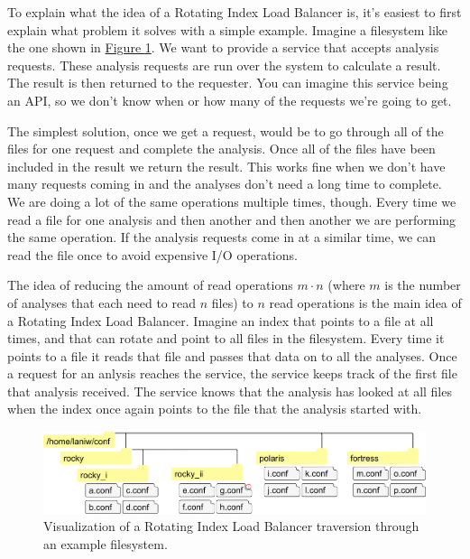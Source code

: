 \documentclass[11pt]{article} %
\newcommand{\rilb}{Rotating Index Load Balancer}
\newcommand{\hidelinks}[1]{{\hypersetup{hidelinks}#1}}
\newcommand{\figref}[1]{\hidelinks{\hyperref[#1]{Figure \ref{#1}}}}
\begin{document}
  To explain what the idea of a \rilb{} is, it's easiest to first explain what problem it solves with a simple example. Imagine a filesystem like the one shown in \figref{fig:rilb-vis}. We want to provide a service that accepts analysis requests. These analysis requests are run over the system to calculate a result. The result is then returned to the requester. You can imagine this service being an API, so we don't know when or how many of the requests we're going to get.

  The simplest solution, once we get a request, would be to go through all of the files for one request and complete the analysis. Once all of the files have been included in the result we return the result. This works fine when we don't have many requests coming in and the analyses don't need a long time to complete. We are doing a lot of the same operations multiple times, though. Every time we read a file for one analysis and then another and then another we are performing the same operation. If the analysis requests come in at a similar time, we can read the file once to avoid expensive I/O operations.

  The idea of reducing the amount of read operations $m \cdot n$ (where $m$ is the number of analyses that each need to read $n$ files) to $n$ read operations is the main idea of a \rilb{}. Imagine an index that points to a file at all times, and that can rotate and point to all files in the filesystem. Every time it points to a file it reads that file and passes that data on to all the analyses. Once a request for an anlysis reaches the service, the service keeps track of the first file that analysis received. The service knows that the analysis has looked at all files when the index once again points to the file that the analysis started with.

  \begin{figure}[H]
    \centering
    \includegraphics[width=.99\linewidth, keepaspectratio]{res/rilb_visualization}
    \caption{Visualization of a \rilb{} traversion through an example filesystem.}
    \label{fig:rilb-vis}
  \end{figure}
\end{document}
